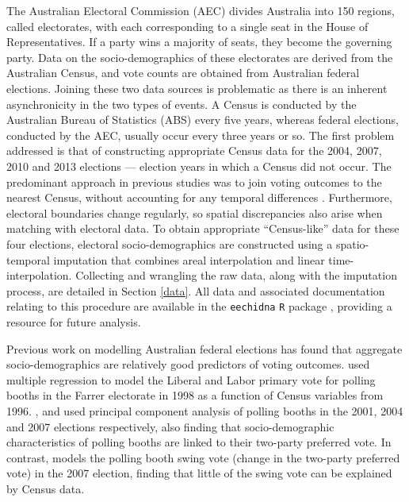 \documentclass[times, doublespace]{anzsauth}
\begin{document}
The Australian Electoral Commission (AEC) divides Australia into 150 regions, called electorates, with each corresponding to a single seat in the House of Representatives. If a party wins a majority of seats, they become the governing party. Data on the socio-demographics of these electorates are derived from the Australian Census, and vote counts are obtained from Australian federal elections. Joining these two data sources is problematic as there is an inherent asynchronicity in the two types of events. A Census is conducted by the Australian Bureau of Statistics (ABS) every five years, whereas federal elections, conducted by the AEC, usually occur every three years or so. The first problem addressed is that of constructing appropriate Census data for the 2004, 2007, 2010 and 2013 elections --- election years in which a Census did not occur. The predominant approach in previous studies was to join voting outcomes to the nearest Census, without accounting for any temporal differences \citep[see][]{DavisStimson98, Stimson06, Liao09, Stimson09}. Furthermore, electoral boundaries change regularly, so spatial discrepancies also arise when matching with electoral data. To obtain appropriate ``Census-like'' data for these four elections, electoral socio-demographics are constructed using a spatio-temporal imputation that combines areal interpolation \citep{Goodchild1993} and linear time-interpolation. Collecting and wrangling the raw data, along with the imputation process, are detailed in Section \ref{data}. All data and associated documentation relating to this procedure are available in the \texttt{eechidna} \texttt{R} package \citep{eechidna}, providing a resource for future analysis.

Previous work on modelling Australian federal elections has found that aggregate socio-demographics are relatively good predictors of voting outcomes. \citet{Forrest01} used multiple regression to model the Liberal and Labor primary vote for polling booths in the Farrer electorate in 1998 as a function of Census variables from 1996. \citet{Stimson06}, \citet{Stimson09} and \citet{Stimson12} used principal component analysis of polling booths in the 2001, 2004 and 2007 elections respectively, also finding that socio-demographic characteristics of polling booths are linked to their two-party preferred vote. In contrast, \citet{Stimson09} models the polling booth swing vote (change in the two-party preferred vote) in the 2007 election, finding that little of the swing vote can be explained by Census data.
\end{document}

